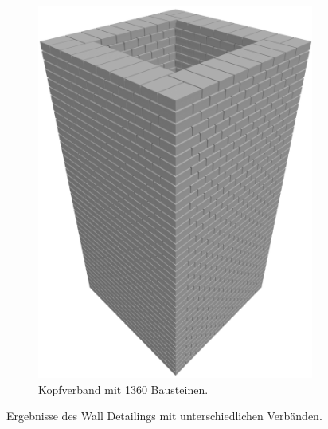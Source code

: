 \begin{figure}[htb]
\begin{subfigure}[b]{0.3\columnwidth}
      \includegraphics[width=\columnwidth]{fig/scenario1_render_headbond.png}
      \caption{Kopfverband mit 1360 Bausteinen.}\label{fig:poc:render_headbond}
    \end{subfigure}
    \caption{Ergebnisse des Wall Detailings mit unterschiedlichen Verbänden.}\label{fig:poc:result_scenario1}
\end{figure}

